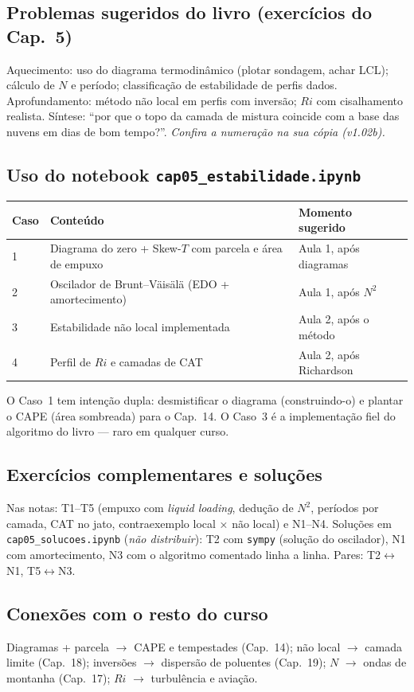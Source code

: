 \subsection*{Problemas sugeridos do livro (exercícios do Cap.~5)}

Aquecimento: uso do diagrama termodinâmico (plotar sondagem, achar LCL);
cálculo de $N$ e período; classificação de estabilidade de perfis dados.
Aprofundamento: método não local em perfis com inversão; $Ri$ com
cisalhamento realista. Síntese: ``por que o topo da camada de mistura
coincide com a base das nuvens em dias de bom tempo?''.
\emph{Confira a numeração na sua cópia (v1.02b).}

\subsection*{Uso do notebook \texttt{cap05\_estabilidade.ipynb}}

\begin{center}
\begin{tabular}{lll}
\hline
Caso & Conteúdo & Momento sugerido \\
\hline
1 & Diagrama do zero + Skew-$T$ com parcela e área de empuxo & Aula 1, após diagramas \\
2 & Oscilador de Brunt--Väisälä (EDO + amortecimento) & Aula 1, após $N^2$ \\
3 & Estabilidade não local implementada & Aula 2, após o método \\
4 & Perfil de $Ri$ e camadas de CAT & Aula 2, após Richardson \\
\hline
\end{tabular}
\end{center}

O Caso~1 tem intenção dupla: desmistificar o diagrama (construindo-o) e
plantar o CAPE (área sombreada) para o Cap.~14. O Caso~3 é a implementação
fiel do algoritmo do livro — raro em qualquer curso.

\subsection*{Exercícios complementares e soluções}

Nas notas: T1--T5 (empuxo com \emph{liquid loading}, dedução de $N^2$,
períodos por camada, CAT no jato, contraexemplo local × não local) e
N1--N4. Soluções em \texttt{cap05\_solucoes.ipynb} (\emph{não distribuir}):
T2 com \texttt{sympy} (solução do oscilador), N1 com amortecimento, N3 com
o algoritmo comentado linha a linha. Pares: T2$\leftrightarrow$N1,
T5$\leftrightarrow$N3.

\subsection*{Conexões com o resto do curso}

Diagramas + parcela $\to$ CAPE e tempestades (Cap.~14); não local $\to$
camada limite (Cap.~18); inversões $\to$ dispersão de poluentes (Cap.~19);
$N$ $\to$ ondas de montanha (Cap.~17); $Ri$ $\to$ turbulência e aviação.
